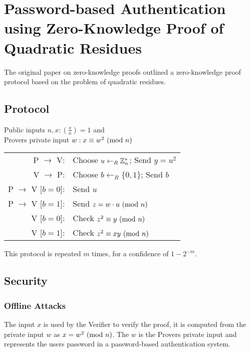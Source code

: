 \section{Password-based Authentication using Zero-Knowledge Proof of Quadratic Residues}

The original paper on zero-knowledge proofs outlined a zero-knowledge proof protocol based on the problem of quadratic residues.

\subsection{Protocol} %

Public inputs $n,x: (\frac{x}{n}) = 1$ and\\
Provers private input $w: x \equiv w^2 \ (\mathrm{mod}\ n)$\\
\begin{center}
\begin{tabular}{rl}
	P $\rightarrow$ V: & Choose $u \leftarrow_R \Bbb{Z}_{n}^{*}$; Send $y = u^2$\\
	V $\rightarrow$ P: & Choose $b \leftarrow_R \{0, 1\} $; Send $b$\\
	P $\rightarrow$ V [$b = 0$]: & Send $u$\\
	P $\rightarrow$ V [$b = 1$]: & Send $z = w \cdot u \ (\mathrm{mod}\ n)$\\
	V [$b = 0$]: & Check $z^2 \equiv y \ (\mathrm{mod}\ n)$\\
	V [$b = 1$]: & Check $z^2 \equiv xy \ (\mathrm{mod}\ n)$\\
\end{tabular}
\end{center}

This protocol is repeated $m$ times, for a confidence of $1 - 2^{-m}$.

\subsection{Security}

\subsubsection{Offline Attacks}
The input $x$ is used by the Verifier to verify the proof, it is computed from the private input $w$ as $x = w^2 \ (\mathrm{mod}\ n)$.
The $w$ is the Provers private input and represents the users password in a password-based authentication system.

